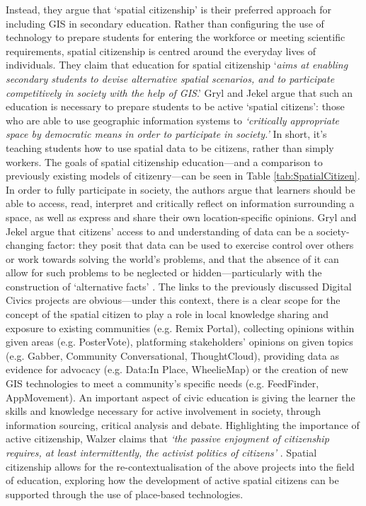 Instead, they argue that `spatial citizenship' is their preferred approach for including GIS in secondary education. Rather than configuring the use of technology to prepare students for entering the workforce or meeting scientific requirements, spatial citizenship is centred around the everyday lives of individuals. They claim that education for spatial citizenship `\textit{aims at enabling secondary students to devise alternative spatial scenarios, and to participate competitively in society with the help of GIS}.' Gryl and Jekel argue that such an education is necessary to prepare students to be active `spatial citizens': those who are able to use geographic information systems to \textit{`critically appropriate space by democratic means in order to participate in society.’} In short, it's teaching students how to use spatial data to be citizens, rather than simply workers. The goals of spatial citizenship education---and a comparison to previously existing models of citizenry---can be seen in Table \ref{tab:SpatialCitizen}. In order to fully participate in society, the authors argue that learners should be able to access, read, interpret and critically reflect on information surrounding a space, as well as express and share their own location-specific opinions. Gryl and Jekel argue that citizens' access to and understanding of data can be a society-changing factor: they posit that data can be used to exercise control over others or work towards solving the world's problems, and that the absence of it can allow for such problems to be neglected or hidden---particularly with the construction of `alternative facts' \citep{gryl2018}. The links to the previously discussed Digital Civics projects are obvious---under this context, there is a clear scope for the concept of the spatial citizen to play a role in local knowledge sharing and exposure to existing communities (e.g. Remix Portal), collecting opinions within given areas (e.g. PosterVote), platforming stakeholders' opinions on given topics (e.g. Gabber, Community Conversational, ThoughtCloud), providing data as evidence for advocacy (e.g. Data:In Place, WheelieMap) or the creation of new GIS technologies to meet a community's specific needs (e.g. FeedFinder, AppMovement). An important aspect of civic education is giving the learner the skills and knowledge necessary for active involvement in society, through information sourcing, critical analysis and debate. Highlighting the importance of active citizenship, Walzer claims that \textit{`the passive enjoyment of citizenship requires, at least intermittently, the activist politics of citizens’} \citep{Walzer1983}. Spatial citizenship allows for the re-contextualisation of the above projects into the field of education, exploring how the development of active spatial citizens can be supported through the use of place-based technologies. 

